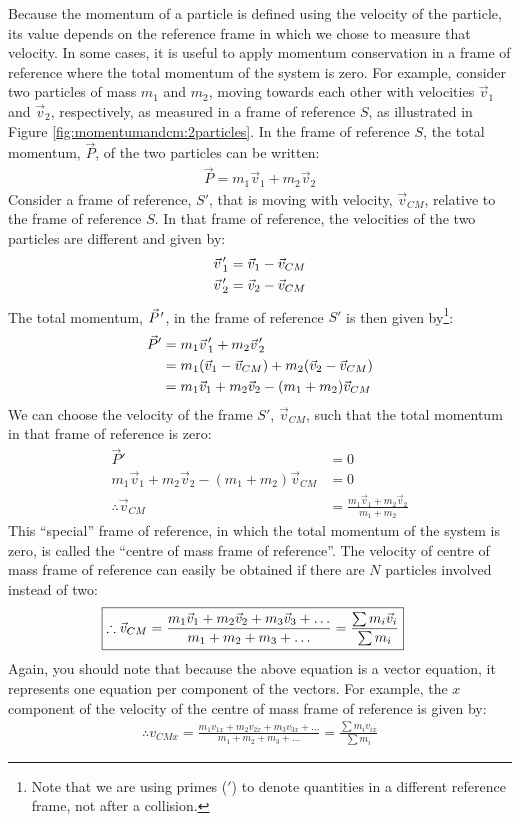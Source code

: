 Because the momentum of a particle is defined using the velocity of the particle, its value depends on the reference frame in which we chose to measure that velocity. In some cases, it is useful to apply momentum conservation in a frame of reference where the total momentum of the system is zero. For example, consider two particles of mass $m_1$ and $m_2$, moving towards each other with velocities $\vec v_1$ and $\vec v_2$, respectively, as measured in a frame of reference $S$, as illustrated in Figure \ref{fig:momentumandcm:2particles}.
In the frame of reference $S$, the total momentum, $\vec P$, of the two particles can be written:
\begin{align*}
\vec P = m_1\vec v_1 + m_2\vec v_2
\end{align*}
Consider a frame of reference, $S'$, that is moving with velocity, $\vec v_{CM}$, relative to the frame of reference $S$. In that frame of reference, the velocities of the two particles are different and given by:
\begin{align*}
\pvec v'_1&=\vec v_1- \vec v_{CM}\\
\pvec v'_2&=\vec v_2- \vec v_{CM}
\end{align*}
The total momentum, $\pvec P'$, in the frame of reference $S'$ is then given by\footnote{Note that we are using primes ($'$) to denote quantities in a different reference frame, not after a collision.}:
\begin{align*}
\vec P' &= m_1\pvec v'_1 + m_2 \pvec v'_2\\
&=m_1(\vec v_1- \vec v_{CM})+m_2(\vec v_2- \vec v_{CM})\\
&= m_1\vec v_1 + m_2\vec v_2 - (m_1+m_2) \vec v_{CM}
\end{align*}
We can choose the velocity of the frame $S'$, $\vec v_{CM}$, such that the total momentum in that frame of reference is zero:
\begin{align*}
\vec P' &= 0\\
m_1\vec v_1 + m_2\vec v_2 - (m_1+m_2) \vec v_{CM} &=0\\
\therefore \vec v_{CM} &= \frac{m_1\vec v_1 + m_2\vec v_2 }{m_1+m_2}
\end{align*}
This ``special'' frame of reference, in which the total momentum of the system is zero, is called the ``centre of mass frame of reference''. The velocity of centre of mass frame of reference can easily be obtained if there are $N$ particles involved instead of two:
\begin{align}
\Aboxed{\therefore \vec v_{CM} = \frac{m_1\vec v_1 + m_2\vec v_2 + m_3 \vec v_3 + \dots }{m_1+m_2+m_3+\dots}=\frac{\sum m_i\vec v_i}{\sum m_i}}
\end{align}
Again, you should note that because the above equation is a vector equation, it represents one equation per component of the vectors. For example, the $x$ component of the velocity of the centre of mass frame of reference is given by:
\begin{align*}
\therefore  v_{CMx} = \frac{m_1 v_{1x} + m_2v_{2x} + m_3 v_{3x} + \dots }{m_1+m_2+m_3+\dots}=\frac{\sum m_iv_{ix}}{\sum m_i}
\end{align*}


